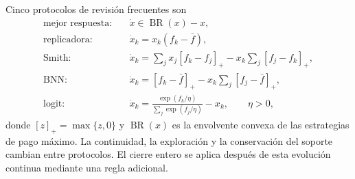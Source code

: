 Cinco protocolos de revisión frecuentes son
\begin{equation}
\begin{aligned}
 \text{mejor respuesta:}\quad &\dot x\in\operatorname{BR}(x)-x,\\
 \text{replicadora:}\quad &\dot x_k=x_k(f_k-\bar f),\\
 \text{Smith:}\quad &\dot x_k=\sum_jx_j[f_k-f_j]_+-x_k\sum_j[f_j-f_k]_+,\\
 \text{BNN:}\quad &\dot x_k=[f_k-\bar f]_+-x_k\sum_j[f_j-\bar f]_+,\\
 \text{logit:}\quad &\dot x_k=\frac{\exp(f_k/\eta)}{\sum_j\exp(f_j/\eta)}-x_k,\qquad \eta>0,
\end{aligned}
\label{eq:tf-population-dynamics}
\end{equation}
donde $[z]_+=\max\{z,0\}$ y $\operatorname{BR}(x)$ es la envolvente convexa de las estrategias de pago máximo. La continuidad, la exploración y la conservación del soporte cambian entre protocolos. El cierre entero se aplica después de esta evolución continua mediante una regla adicional.

